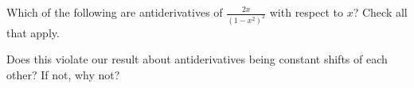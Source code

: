 \documentclass{ximera}
\author{Steven Gubkin}
\begin{document}
\begin{exercise}



Which of the following are antiderivatives of $\frac{2x}{(1-x^2)^2}$ with respect to $x$?  Check all that apply.

\begin{selectAll}
\end{selectAll}

Does this violate our result about antiderivatives being constant shifts of each other?  If not, why not?

\end{exercise}
\end{document}
